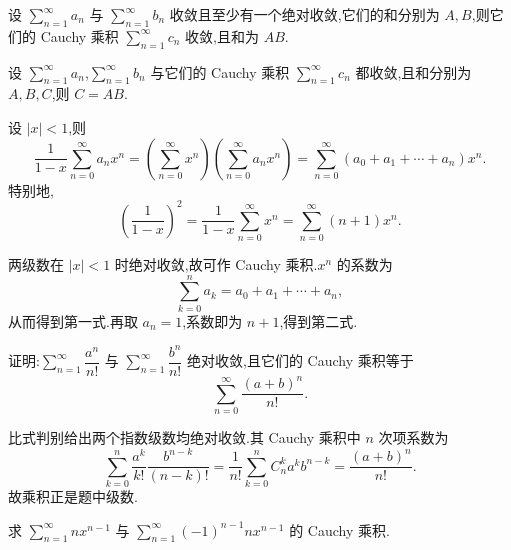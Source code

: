 \begin{theorem}
    设 $\displaystyle\sum\limits_{n=1}^{\infty}a_n$ 与 $\displaystyle\sum\limits_{n=1}^{\infty}b_n$ 收敛且至少有一个绝对收敛,它们的和分别为 $A,B$,则它们的 Cauchy 乘积 $\displaystyle\sum\limits_{n=1}^{\infty}c_n$ 收敛,且和为 $AB$.
\end{theorem}

\begin{theorem}
    设 $\displaystyle\sum\limits_{n=1}^{\infty}a_n$,$\displaystyle\sum\limits_{n=1}^{\infty}b_n$ 与它们的 Cauchy 乘积 $\displaystyle\sum\limits_{n=1}^{\infty}c_n$ 都收敛,且和分别为 $A,B,C$,则 $C=AB$.
\end{theorem}

\begin{example}[\markstar]
    设 $|x|<1$,则
    \[
        \dfrac{1}{1-x}\sum\limits_{n=0}^{\infty}a_nx^n
        =\left(\sum\limits_{n=0}^{\infty}x^n\right)
        \left(\sum\limits_{n=0}^{\infty}a_nx^n\right)
        =\sum\limits_{n=0}^{\infty}(a_0+a_1+\cdots+a_n)x^n.
    \]
    特别地,
    \[
        \left(\dfrac{1}{1-x}\right)^2
        =\dfrac{1}{1-x}\sum\limits_{n=0}^{\infty}x^n
        =\sum\limits_{n=0}^{\infty}(n+1)x^n.
    \]
\end{example}
\exampleblank

\begin{solution}
    两级数在 $|x|<1$ 时绝对收敛,故可作 Cauchy 乘积.$x^n$ 的系数为
    \[
        \displaystyle\sum\limits_{k=0}^{n}a_k=a_0+a_1+\cdots+a_n,
    \]
    从而得到第一式.再取 $a_n=1$,系数即为 $n+1$,得到第二式.
\end{solution}

\begin{example}
    证明:$\displaystyle\sum\limits_{n=1}^{\infty}\dfrac{a^n}{n!}$ 与 $\displaystyle\sum\limits_{n=1}^{\infty}\dfrac{b^n}{n!}$ 绝对收敛,且它们的 Cauchy 乘积等于
    \[
        \displaystyle\sum\limits_{n=0}^{\infty}\dfrac{(a+b)^n}{n!}.
    \]
\end{example}
\exampleblank

\begin{solution}
    比式判别给出两个指数级数均绝对收敛.其 Cauchy 乘积中 $n$ 次项系数为
    \[
        \displaystyle\sum\limits_{k=0}^{n}\dfrac{a^k}{k!}\dfrac{b^{n-k}}{(n-k)!}
        =\dfrac{1}{n!}\sum\limits_{k=0}^{n}C_n^ka^kb^{n-k}
        =\dfrac{(a+b)^n}{n!}.
    \]
    故乘积正是题中级数.
\end{solution}

\begin{example}
    求 $\displaystyle\sum\limits_{n=1}^{\infty}nx^{n-1}$ 与 $\displaystyle\sum\limits_{n=1}^{\infty}(-1)^{n-1}nx^{n-1}$ 的 Cauchy 乘积.
\end{example}
\exampleblank

